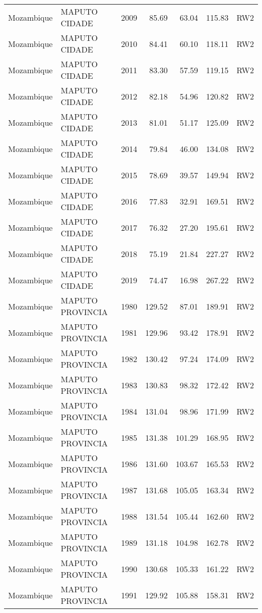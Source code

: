 \begin{longtable}{lllrrrl}
  Mozambique & MAPUTO CIDADE & 2009 & 85.69 & 63.04 & 115.83 & RW2 \\ 
  Mozambique & MAPUTO CIDADE & 2010 & 84.41 & 60.10 & 118.11 & RW2 \\ 
  Mozambique & MAPUTO CIDADE & 2011 & 83.30 & 57.59 & 119.15 & RW2 \\ 
  Mozambique & MAPUTO CIDADE & 2012 & 82.18 & 54.96 & 120.82 & RW2 \\ 
  Mozambique & MAPUTO CIDADE & 2013 & 81.01 & 51.17 & 125.09 & RW2 \\ 
  Mozambique & MAPUTO CIDADE & 2014 & 79.84 & 46.00 & 134.08 & RW2 \\ 
  Mozambique & MAPUTO CIDADE & 2015 & 78.69 & 39.57 & 149.94 & RW2 \\ 
  Mozambique & MAPUTO CIDADE & 2016 & 77.83 & 32.91 & 169.51 & RW2 \\ 
  Mozambique & MAPUTO CIDADE & 2017 & 76.32 & 27.20 & 195.61 & RW2 \\ 
  Mozambique & MAPUTO CIDADE & 2018 & 75.19 & 21.84 & 227.27 & RW2 \\ 
  Mozambique & MAPUTO CIDADE & 2019 & 74.47 & 16.98 & 267.22 & RW2 \\ 
  Mozambique & MAPUTO PROVINCIA & 1980 & 129.52 & 87.01 & 189.91 & RW2 \\ 
  Mozambique & MAPUTO PROVINCIA & 1981 & 129.96 & 93.42 & 178.91 & RW2 \\ 
  Mozambique & MAPUTO PROVINCIA & 1982 & 130.42 & 97.24 & 174.09 & RW2 \\ 
  Mozambique & MAPUTO PROVINCIA & 1983 & 130.83 & 98.32 & 172.42 & RW2 \\ 
  Mozambique & MAPUTO PROVINCIA & 1984 & 131.04 & 98.96 & 171.99 & RW2 \\ 
  Mozambique & MAPUTO PROVINCIA & 1985 & 131.38 & 101.29 & 168.95 & RW2 \\ 
  Mozambique & MAPUTO PROVINCIA & 1986 & 131.60 & 103.67 & 165.53 & RW2 \\ 
  Mozambique & MAPUTO PROVINCIA & 1987 & 131.68 & 105.05 & 163.34 & RW2 \\ 
  Mozambique & MAPUTO PROVINCIA & 1988 & 131.54 & 105.44 & 162.60 & RW2 \\ 
  Mozambique & MAPUTO PROVINCIA & 1989 & 131.18 & 104.98 & 162.78 & RW2 \\ 
  Mozambique & MAPUTO PROVINCIA & 1990 & 130.68 & 105.33 & 161.22 & RW2 \\ 
  Mozambique & MAPUTO PROVINCIA & 1991 & 129.92 & 105.88 & 158.31 & RW2 \\ 

\end{longtable}
